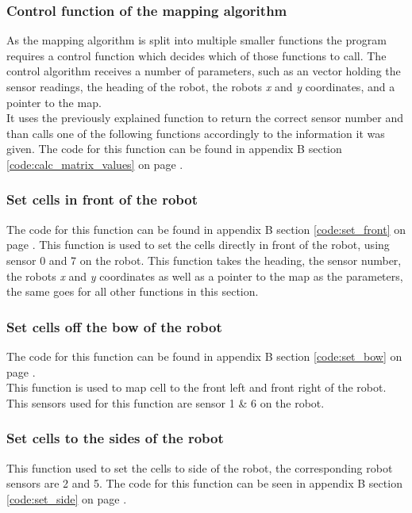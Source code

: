 \subsubsection{Control function of the mapping algorithm}
\label{chap3:calc_matrix_value}
As the mapping algorithm is split into multiple smaller functions the program requires a control function which decides which of those functions to call. 
The control algorithm receives a number of parameters, such as an vector holding the sensor readings, the heading of the robot, the robots \textit{x} and \textit{y} coordinates, and a pointer to the map.\\
It uses the previously explained function to return the correct sensor number and than calls one of the following functions accordingly to the information it was given. 
The code for this function can be found in appendix B section \ref{code:calc_matrix_values} on page \pageref{code:calc_matrix_values}.

\subsubsection{Set cells in front of the robot}
\label{chap3:set_front}
The code for this function can be found in appendix B section \ref{code:set_front} on page \pageref{code:set_front}. 
This function is used to set the cells directly in front of the robot, using sensor 0 and 7 on the robot. This function takes the heading, the sensor number, the robots \textit{x} and \textit{y} coordinates as well as a pointer to the map as the parameters, the same goes for all other functions in this section. \\

\subsubsection{Set cells off the bow of the robot}
The code for this function can be found in appendix B section \ref{code:set_bow} on page \pageref{code:set_bow}. \\
This function is used to map cell to the front left and front right of the robot. This sensors used for this function are sensor 1 \& 6 on the robot.  

\subsubsection{Set cells to the sides of the robot}
This function used to set the cells to side of the robot, the corresponding robot sensors are 2 and 5. The code for this function can be seen in appendix B section \ref{code:set_side} on page \pageref{code:set_side}. 

